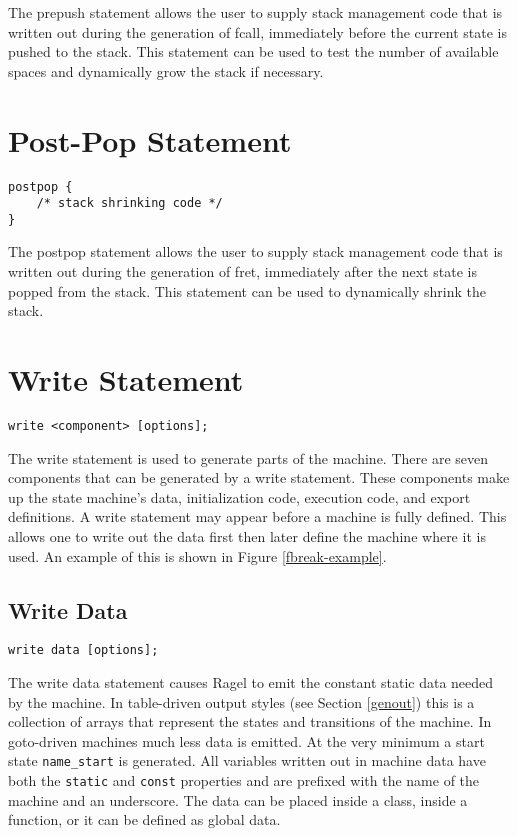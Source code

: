 \documentclass[letterpaper,11pt,oneside]{book}
\newcommand{\verbspace}{\vspace{10pt}}
\begin{document}
The prepush statement allows the user to supply stack management code that is
written out during the generation of fcall, immediately before the current
state is pushed to the stack. This statement can be used to test the number of
available spaces and dynamically grow the stack if necessary.

\section{Post-Pop Statement}
\label{postpop}

\begin{verbatim}
postpop { 
    /* stack shrinking code */
}
\end{verbatim}
\verbspace

The postpop statement allows the user to supply stack management code that is
written out during the generation of fret, immediately after the next state is
popped from the stack. This statement can be used to dynamically shrink the
stack.

\section{Write Statement}
\label{write-statement}

\begin{verbatim}
write <component> [options];
\end{verbatim}
\verbspace

The write statement is used to generate parts of the machine. 
There are seven
components that can be generated by a write statement. These components make up the
state machine's data, initialization code, execution code, and export definitions.
A write statement may appear before a machine is fully defined.
This allows one to write out the data first then later define the machine where
it is used. An example of this is shown in Figure \ref{fbreak-example}.

\subsection{Write Data}
\begin{verbatim}
write data [options];
\end{verbatim}
\verbspace

The write data statement causes Ragel to emit the constant static data needed
by the machine. In table-driven output styles (see Section \ref{genout}) this
is a collection of arrays that represent the states and transitions of the
machine.  In goto-driven machines much less data is emitted. At the very
minimum a start state \verb|name_start| is generated.  All variables written
out in machine data have both the \verb|static| and \verb|const| properties and
are prefixed with the name of the machine and an
underscore. The data can be placed inside a class, inside a function, or it can
be defined as global data.
\end{document}
